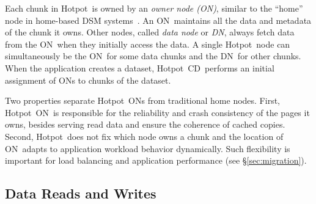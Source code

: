 \documentclass[sigconf]{acmart}
\renewcommand{\em}{\it}
\newcommand{\nvm}{PM}
\newcommand{\hotpot}{Hotpot}
\newcommand{\cd}{CD}
\newcommand{\on}{ON}
\newcommand{\dn}{DN}
\newcommand{\committed}{committed}
\providecommand{\DIFaddbegin}{} %
\providecommand{\DIFaddend}{} %
\providecommand{\DIFdelbegin}{} %
\providecommand{\DIFdelend}{} %
\begin{document}
{\DIFaddend Each chunk in \hotpot\ is owned by an {\em owner node (\on)},
similar to the ``home'' node in home-based DSM systems~\cite{HLRC}.
An \on\ maintains all the data and metadata of the chunk it owns.
Other nodes, called {\em data node} or {\em \dn}, always fetch data from the \on\
when they initially access the data.
A single \hotpot\ node can simultaneously be the \on\ for some data chunks and the \dn\ for other chunks.
When the application creates a dataset, 
\hotpot\ \cd\ performs an initial assignment of \on{}s to chunks of the dataset.

Two properties separate \hotpot\ \on{}s from traditional home nodes.
First, %
\hotpot\ \on\ is responsible for the reliability and crash consistency of the pages it owns,
besides serving read data and ensure the coherence of cached copies.
Second, \hotpot\ does not fix which node owns a chunk
and the location of \on\ adapts to application workload behavior dynamically.
Such flexibility is important for load balancing and application performance (see \S\ref{sec:migration}).

\DIFdelbegin %



\DIFdelend \DIFaddbegin \subsection{Data Reads and Writes}
\DIFaddend \label{sec:readwrite}
\DIFdelbegin %
\DIFdelend 

}
\end{document}
